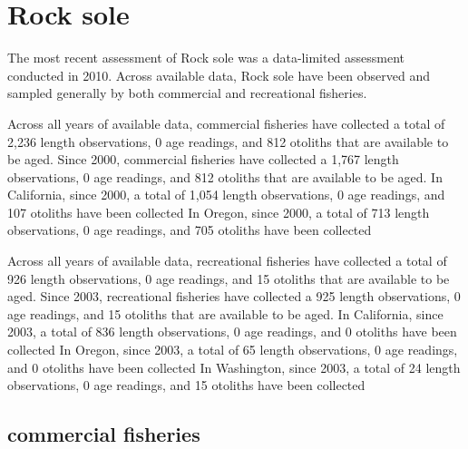 \documentclass[11pt,
  english,
  letterpaper,
]{article}
\begin{document}
\hypertarget{rock-sole}{%
\section{Rock sole}\label{rock-sole}}

\leavevmode\tagmcend\tagstructend


The most recent assessment of Rock sole was a data-limited assessment conducted in 2010. Across available data, Rock sole have been observed and sampled generally by both commercial and recreational fisheries.

\leavevmode\tagmcend\tagstructend\par


Across all years of available data, commercial fisheries have collected a total of 2,236 length observations, 0 age readings, and 812 otoliths that are available to be aged. Since 2000, commercial fisheries have collected a 1,767 length observations, 0 age readings, and 812 otoliths that are available to be aged. In California, since 2000, a total of 1,054 length observations, 0 age readings, and 107 otoliths have been collected In Oregon, since 2000, a total of 713 length observations, 0 age readings, and 705 otoliths have been collected

\leavevmode\tagmcend\tagstructend\par


Across all years of available data, recreational fisheries have collected a total of 926 length observations, 0 age readings, and 15 otoliths that are available to be aged. Since 2003, recreational fisheries have collected a 925 length observations, 0 age readings, and 15 otoliths that are available to be aged. In California, since 2003, a total of 836 length observations, 0 age readings, and 0 otoliths have been collected In Oregon, since 2003, a total of 65 length observations, 0 age readings, and 0 otoliths have been collected In Washington, since 2003, a total of 24 length observations, 0 age readings, and 15 otoliths have been collected

\leavevmode\tagmcend\tagstructend\par


\hypertarget{commercial-fisheries-40}{%
\subsection{commercial fisheries}\label{commercial-fisheries-40}}
\end{document}
